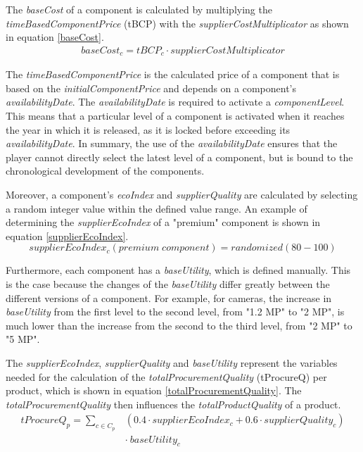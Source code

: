 The \textit{baseCost} of a component is calculated by multiplying the \textit{timeBasedComponentPrice} (\gls{tBCP}) with the \textit{supplierCostMultiplicator} as shown in equation \ref{baseCost}.
\begin{equation}
\label{baseCost}
\begin{aligned}
   baseCost_{c} = tBCP_{c} \cdot supplierCostMultiplicator
\end{aligned}    
\end{equation}

The \textit{timeBasedComponentPrice} is the calculated price of a component that is based on the \textit{initialComponentPrice} and depends on a component's \textit{availabilityDate}. The \textit{availabilityDate} is required to activate a \textit{componentLevel}. This means that a particular level of a component is activated when it reaches the year in which it is released, as it is locked before exceeding its \textit{availabilityDate}. In summary, the use of the \textit{availabilityDate} ensures that the player cannot directly select the latest level of a component, but is bound to the chronological development of the components.

Moreover, a component's \textit{ecoIndex} and \textit{supplierQuality} are calculated by selecting a random integer value within the defined value range. An example of determining the \textit{supplierEcoIndex} of a "premium" component is shown in equation \ref{supplierEcoIndex}.
\begin{equation}
\label{supplierEcoIndex}
    supplierEcoIndex_{c}(premium \; component) = randomized(80-100)
\end{equation}

Furthermore, each component has a \textit{baseUtility}, which is defined manually. This is the case because the changes of the \textit{baseUtility} differ greatly between the different versions of a component. For example, for cameras, the increase in \textit{baseUtility} from the first level to the second level, from "1.2 MP" to "2 MP", is much lower than the increase from the second to the third level, from "2 MP" to "5 MP".

The \textit{supplierEcoIndex}, \textit{supplierQuality} and \textit{baseUtility} represent the variables needed for the calculation of the \textit{totalProcurementQuality} (\gls{tProcureQ}) per product, which is shown in equation \ref{totalProcurementQuality}. The \textit{totalProcurementQuality} then influences the \textit{totalProductQuality} of a product.
\begin{equation}
\label{totalProcurementQuality}
\begin{aligned}
    tProcureQ_{p}= \sum_{c \in C_p} & (0.4 \cdot supplierEcoIndex_{c} + 0.6 \cdot supplierQuality_{c})\\
    & \cdot ~baseUtility_{c}
    \end{aligned}
\end{equation}

